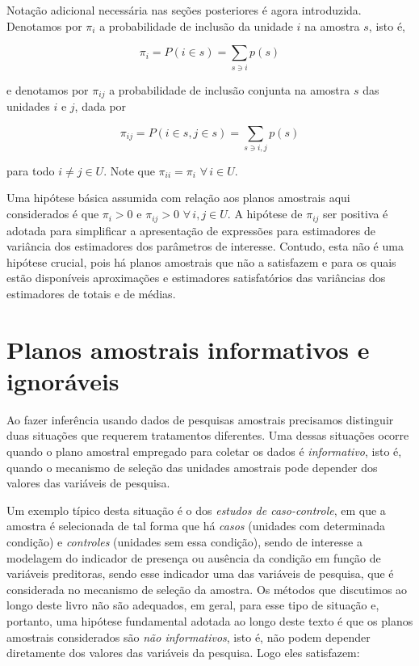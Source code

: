 \documentclass[
  12pt,
  brazilian,
]{book}
\theoremstyle{definition}
\theoremstyle{definition}
\theoremstyle{definition}
\theoremstyle{definition}
\theoremstyle{remark}
\begin{document}
Notação adicional necessária nas seções posteriores é agora introduzida.
Denotamos por \(\pi_i\) a probabilidade de inclusão da unidade \(i\) na amostra \(s\),
isto é,

\begin{equation}
\pi_i = P\left( i \in s \right) = \sum_{s \ni i} p(s)  \label{eq:ref6}
\end{equation}

e denotamos por \(\pi_{ij}\) a probabilidade de inclusão conjunta na amostra \(s\) das unidades \(i\) e \(j\), dada por

\begin{equation}
\pi_{ij} = P \left( i \in s , j \in s \right) = \sum_{s \ni i,j} p(s) \label{eq:ref7}
\end{equation}

para todo \(i \neq j \in U\). Note que \(\pi_{ii} = \pi_{i}\) \(\forall\, i \in U.\)

Uma hipótese básica assumida com relação aos planos amostrais aqui considerados
é que \(\pi_i > 0\) e \(\pi_{ij} > 0\) \(\forall\, i,j \in U.\) A hipótese de \(\pi_{ij}\)
ser positiva é adotada para simplificar a apresentação de expressões para
estimadores de variância dos estimadores dos parâmetros de interesse. Contudo,
esta não é uma hipótese crucial, pois há planos amostrais que não a satisfazem e
para os quais estão disponíveis aproximações e estimadores satisfatórios das
variâncias dos estimadores de totais e de médias.

\hypertarget{inform}{%
\section{Planos amostrais informativos e ignoráveis}\label{inform}}

Ao fazer inferência usando dados de pesquisas amostrais precisamos distinguir
duas situações que requerem tratamentos diferentes. Uma dessas situações ocorre quando o plano
amostral empregado para coletar os dados é \emph{informativo}, isto é,
quando o mecanismo de seleção das unidades amostrais pode depender dos valores
das variáveis de pesquisa.

Um exemplo típico desta situação é o dos \emph{estudos de caso-controle}, em que a amostra
é selecionada de tal forma que há \emph{casos} (unidades com determinada condição)
e \emph{controles} (unidades sem essa condição), sendo de interesse a modelagem do indicador
de presença ou ausência da condição em função de variáveis preditoras, sendo esse indicador
uma das variáveis de pesquisa, que é considerada no mecanismo de seleção da amostra. Os
métodos que discutimos ao longo deste livro não são adequados, em geral, para esse tipo
de situação e, portanto, uma hipótese fundamental adotada ao longo deste texto é que os
planos amostrais considerados são \emph{não informativos}, isto é, não podem depender
diretamente dos valores das variáveis da pesquisa. Logo eles satisfazem:
\end{document}
